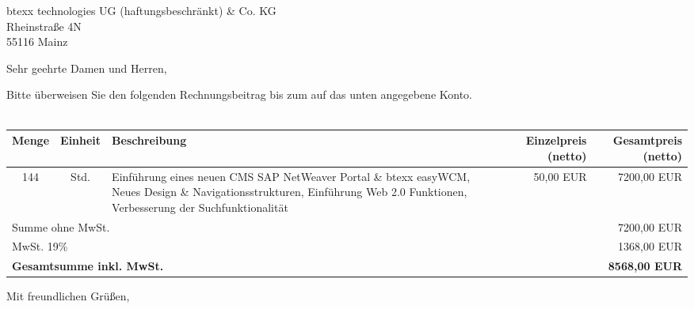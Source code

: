 \documentclass[fontsize=11pt, paper=a4, headsepline=off, fromalign=right, fromphone=on, fromrule=aftername, fromfax=off, fromemail=on, fromurl=off, fromlogo=on, addrfield=on, backaddress=on, subject=beforeopening, locfield=narrow, foldmarks=on, numericaldate=off, refline=narrow, firstfoot=on, draft=off]{scrlttr2}
\begin{document}
\begin{letter}
{
btexx technologies UG (haftungsbeschränkt) \& Co. KG\\
Rheinstraße 4N\\
55116 Mainz\\
}
\opening{Sehr geehrte Damen und Herren,}

Bitte überweisen Sie den folgenden Rechnungsbeitrag bis zum \DayAfter[14] auf das unten angegebene Konto.\\
\\
\vspace{5pt}
\begin{tabularx}{\textwidth}{ccXrr}
\hline
\tiny {Menge} & \tiny {Einheit} & \tiny {Beschreibung} & \tiny {Einzelpreis (netto)} & \tiny {Gesamtpreis (netto)} \\ \hline
 144 & Std. & Einführung eines neuen CMS SAP NetWeaver Portal \& btexx easyWCM, Neues Design \& Navigationsstrukturen, Einführung Web 2.0 Funktionen, Verbesserung der Suchfunktionalität & \multicolumn{1}{r}{50,00 EUR} & \multicolumn{1}{r}{7200,00 EUR} \\ \hline \hline
\multicolumn{ 4}{l}{\small{Summe ohne MwSt.}} & 7200,00 EUR \\ \hline
\multicolumn{ 4}{l}{\small{MwSt. 19\% }} & 1368,00 EUR \\ \hline \hline
\multicolumn{ 4}{l}{ \textbf{Gesamtsumme inkl. MwSt.} } & \textbf{8568,00 EUR} \\ \hline
\end{tabularx}

\closing{Mit freundlichen Grüßen,}
\end{letter}
\end{document}
